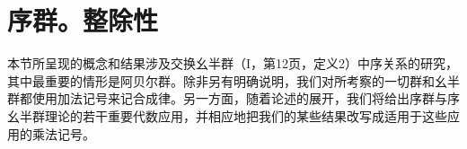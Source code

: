 \section{序群。整除性}

本节所呈现的概念和结果涉及交换幺半群（I，第12页，定义2）中序关系的研究，其中最重要的情形是阿贝尔群。除非另有明确说明，我们对所考察的一切群和幺半群都使用加法记号来记合成律。另一方面，随着论述的展开，我们将给出序群与序幺半群理论的若干重要代数应用，并相应地把我们的某些结果改写成适用于这些应用的乘法记号。

